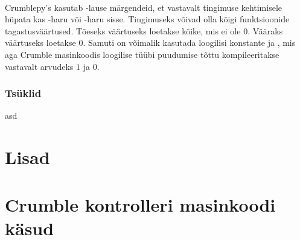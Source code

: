 \documentclass[12pt]{article}
\begin{document}
\inputminted{text}{if-code-asm.crpy}
~

Crumblepy's kasutab -lause märgendeid, et vastavalt tingimuse kehtimisele hüpata kas -haru või -haru sisse. Tingimuseks võivad olla kõigi funktsioonide tagastusväärtused. Tõeseks väärtuseks loetakse kõike, mis ei ole $0$. Vääraks väärtuseks loetakse $0$. Samuti on võimalik kasutada loogilisi konstante  ja , mis aga Crumble masinkoodis loogilise tüübi puudumise tõttu kompileeritakse vastavalt arvudeks $1$ ja $0$.

\subsubsection{Tsüklid}
asd

\printbibliography[heading=bibintoc,title={Viidatud kirjandus}]
\section*{Lisad}
\setcounter{section}{0}
\renewcommand{\thesection}{\Roman{section}}
\section{Crumble kontrolleri masinkoodi käsud} \label{masinkoodi-käsud}
\newpage
\end{document}
